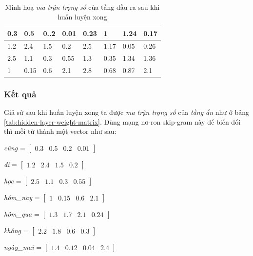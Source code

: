 \begin{table}[!h]
\centering
\begin{tabular}{|l|l|l|l|l|l|l|l|}
\hline
0.3 & 0.5  & 0..2 & 0.01 & 0.23 & 1    & 1.24 & 0.17 \\ \hline
1.2 & 2.4  & 1.5  & 0.2  & 2.5  & 1.17 & 0.05 & 0.26 \\ \hline
2.5 & 1.1  & 0.3  & 0.55 & 1.3  & 0.35 & 1.34 & 1.36 \\ \hline
1   & 0.15 & 0.6  & 2.1  & 2.8  & 0.68 & 0.87 & 2.1  \\ \hline
\end{tabular}
\caption{Minh hoạ \textit{ma trận trọng số} của tầng đầu ra sau khi huấn luyện xong}
\end{table}

\subsubsection{Kết quả}
Giả sử sau khi huấn luyện xong ta được \textit{ma trận trọng số} của \textit{tầng ẩn} như ở bảng \ref{tab:hidden-layer-weight-matrix}. Dùng mạng nơ-ron skip-gram này để biến đổi thì mỗi từ thành một vector như sau:

\textit{cũng} = $\begin{bmatrix}
        0.3 & 0.5 & 0.2 & 0.01
    \end{bmatrix}$
    
\textit{đi} = $\begin{bmatrix}
        1.2 & 2.4 & 1.5 & 0.2
    \end{bmatrix}$
    
\textit{học} = $\begin{bmatrix}
        2.5 & 1.1 & 0.3 & 0.55
    \end{bmatrix}$
    
\textit{hôm\_nay} = $\begin{bmatrix}
        1 & 0.15 & 0.6 & 2.1
    \end{bmatrix}$
    
\textit{hôm\_qua} = $\begin{bmatrix}
        1.3 & 1.7 & 2.1 & 0.24
    \end{bmatrix}$
    
\textit{không} = $\begin{bmatrix}
        2.2 & 1.8 & 0.6 & 0.3
    \end{bmatrix}$
    
\textit{ngày\_mai} = $\begin{bmatrix}
        1.4 & 0.12 & 0.04 & 2.4
    \end{bmatrix}$
    
